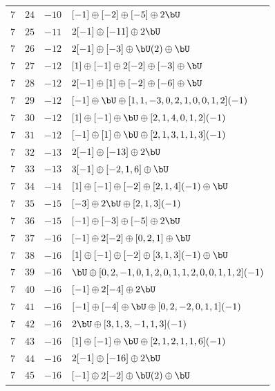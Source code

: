 \begin{center}
\begin{longtable}{llll}
 \(7\) & \(24\) & \(-10\) & \([-1] \oplus [-2] \oplus [-5] \oplus 2 \bU\) \\
 \(7\) & \(25\) & \(-11\) & \(2 [-1] \oplus [-11] \oplus 2 \bU\) \\
 \(7\) & \(26\) & \(-12\) & \(2 [-1] \oplus [-3] \oplus \bU(2) \oplus \bU\) \\
 \(7\) & \(27\) & \(-12\) & \([1] \oplus [-1] \oplus 2 [-2] \oplus [-3] \oplus \bU\) \\
 \(7\) & \(28\) & \(-12\) & \(2 [-1] \oplus [1] \oplus [-2] \oplus [-6] \oplus \bU\) \\
 \(7\) & \(29\) & \(-12\) & \([-1] \oplus \bU \oplus [1, 1, -3, 0, 2, 1, 0, 0, 1, 2](-1)\) \\
 \(7\) & \(30\) & \(-12\) & \([1] \oplus [-1] \oplus \bU \oplus [2, 1, 4, 0, 1, 2](-1)\) \\
 \(7\) & \(31\) & \(-12\) & \([-1] \oplus [1] \oplus \bU \oplus [2, 1, 3, 1, 1, 3](-1)\) \\
 \(7\) & \(32\) & \(-13\) & \(2 [-1] \oplus [-13] \oplus 2 \bU\) \\
 \(7\) & \(33\) & \(-13\) & \(3 [-1] \oplus [-2, 1, 6] \oplus \bU\) \\
 \(7\) & \(34\) & \(-14\) & \([1] \oplus [-1] \oplus [-2] \oplus [2, 1, 4](-1) \oplus \bU\) \\
 \(7\) & \(35\) & \(-15\) & \([-3] \oplus 2 \bU \oplus [2, 1, 3](-1)\) \\
 \(7\) & \(36\) & \(-15\) & \([-1] \oplus [-3] \oplus [-5] \oplus 2 \bU\) \\
 \(7\) & \(37\) & \(-16\) & \([-1] \oplus 2 [-2] \oplus [0, 2, 1] \oplus \bU\) \\
 \(7\) & \(38\) & \(-16\) & \([1] \oplus [-1] \oplus [-2] \oplus [3, 1, 3](-1) \oplus \bU\) \\
 \(7\) & \(39\) & \(-16\) & \(\bU \oplus [0, 2, -1, 0, 1, 2, 0, 1, 1, 2, 0, 0, 1, 1, 2](-1)\) \\
 \(7\) & \(40\) & \(-16\) & \([-1] \oplus 2 [-4] \oplus 2 \bU\) \\
 \(7\) & \(41\) & \(-16\) & \([-1] \oplus [-4] \oplus \bU \oplus [0, 2, -2, 0, 1, 1](-1)\) \\
 \(7\) & \(42\) & \(-16\) & \(2 \bU \oplus [3, 1, 3, -1, 1, 3](-1)\) \\
 \(7\) & \(43\) & \(-16\) & \([1] \oplus [-1] \oplus \bU \oplus [2, 1, 2, 1, 1, 6](-1)\) \\
 \(7\) & \(44\) & \(-16\) & \(2 [-1] \oplus [-16] \oplus 2 \bU\) \\
 \(7\) & \(45\) & \(-16\) & \([-1] \oplus 2 [-2] \oplus \bU(2) \oplus \bU\) \\

\end{longtable}
\end{center}
